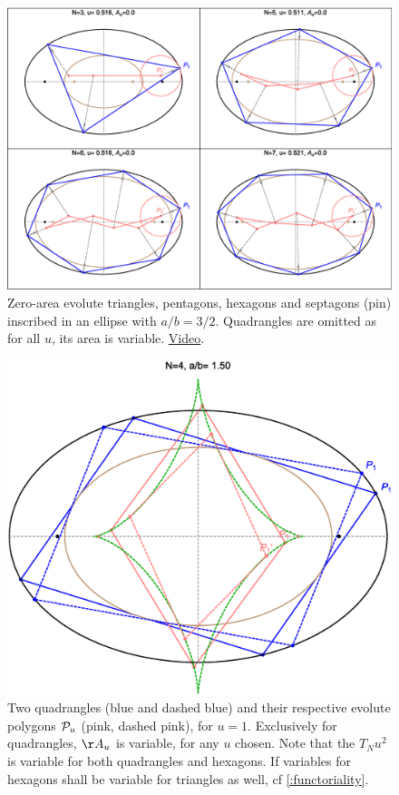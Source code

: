 \begin{figure}
    \centering
    \includegraphics[width=\textwidth]{pics/0080_evolute_poly_zero_area.eps}
    \caption{Zero-area evolute triangles, pentagons, hexagons and septagons (pin) inscribed in an ellipse with $a/b = 3/2$.
             Quadrangles are omitted as for all $u$, its area is variable. \href{https://youtu.be/3nvXYFoI5Wg}{Video}.}
    \label{fig:ev-poly-zero-area}
\end{figure}

\begin{figure}
    \centering
    \includegraphics[width=.7\textwidth]{pics/0050_n4_ev_poly.eps}
    \caption{Two quadrangles (blue and dashed blue) and their respective evolute polygons $\mathcal{P}_u$ (pink, dashed pink), for $u=1$.
             Exclusively for quadrangles, $\AA_u$ is variable, for any $u$ chosen.
             Note that the $T_N u^2$ is variable for both quadrangles and hexagons.
             {\color{red} If variables for hexagons shall be variable for triangles as well, cf \cref{:functoriality}.}
             }
    \label{fig:ev-poly-n4}
\end{figure}


